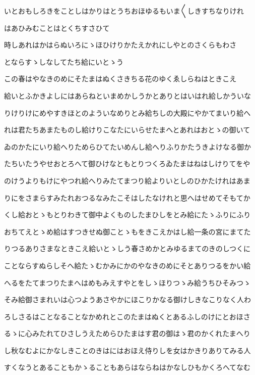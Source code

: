 \documentclass[a4paper,11pt,landscape]{ltjtarticle}
\begin{document}
いとおもしろきをことしはかりはとうちおほゆるもいま〱しきすちなりけれ
\par\medskip
はあひみむことはとくちすさひて
\par\medskip
時しあれはかはらぬいろにゝほひけりかたえかれにしやとのさくらもわさ
\par\medskip
とならすゝしなしてたち給にいとゝう
\par\medskip
この春はやなきのめにそたまはぬくさきちる花のゆくゑしらねはときこえ
\par\medskip
給いとふかきよしにはあらねといまめかしうかとありとはいはれ給しかういな
\par\medskip
りけりけにめやすきほとのよういなめりとみ給ちしの大殿にやかてまいり給へ
\par\medskip
れは君たちあまたものし給けりこなたにいらせたまへとあれはおとゝの御いて
\par\medskip
ゐのかたにいり給へりためらひてたいめんし給へりふりかたうきよけなる御か
\par\medskip
たちいたうやせおとろへて御ひけなともとりつくろゐたまはねはしけりてをや
\par\medskip
のけうよりもけにやつれ給へりみたてまつり給よりいとしのひかたけれはあま
\par\medskip
りにをさまらすみたれおつるなみたこそはしたなけれと思へはせめてそもてか
\par\medskip
くし給おとゝもとりわきて御中よくものしたまひしをとみ給にたゝふりにふり
\par\medskip
おちてえとゝめ給はすつきせぬ御ことゝもをきこえかはし給一条の宮にまてた
\par\medskip
りつるありさまなときこえ給いとゝしう春さめかとみゆるまてのきのしつくに
\par\medskip
ことならすぬらしそへ給たゝむかみにかのやなきのめにそとありつるをかい給
\par\medskip
へるをたてまつりたまへはめもみえすやとをしゝほりつゝみ給うちひそみつゝ
\par\medskip
そみ給御さまれいは心つようあさやかにほこりかなる御けしきなこりなく人わ
\par\medskip
ろしさるはことなることなかめれとこのたまはぬくとあるふしのけにとおほさ
\par\medskip
るゝに心みたれてひさしうえためらひたまはす君の御はゝ君のかくれたまへり
\par\medskip
し秋なむよにかなしきことのきはにはおほえ侍りしを女はかきりありてみる人
\par\medskip
すくなうとあることもかゝることもあらはならねはかなしひもかくろへてなむ
\par\medskip
\end{document}
